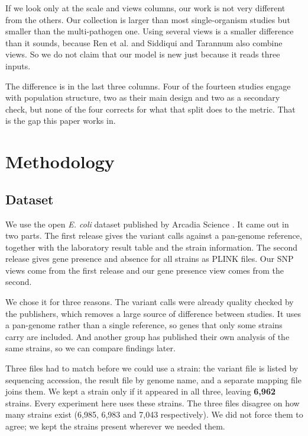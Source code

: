 \documentclass[conference]{IEEEtran}
\begin{document}
If we look only at the scale and views columns, our work is not very different
from the others. Our collection is larger than most single-organism studies but
smaller than the multi-pathogen one. Using several views is a smaller difference
than it sounds, because Ren et al. and Siddiqui and Tarannum also combine views.
So we do not claim that our model is new just because it reads three inputs.

The difference is in the last three columns. Four of the fourteen studies engage
with population structure, two as their main design and two as a secondary check,
but none of the four corrects for what that split does to the metric. That is the
gap this paper works in.

\section{Methodology}
\label{sec:method}

\subsection{Dataset}

We use the open \textit{E. coli} dataset published by Arcadia Science
\cite{morin2024,york2025}. It came out in two parts. The first release gives the
variant calls against a pan-genome reference, together with the laboratory result
table and the strain information. The second release gives gene presence and
absence for all strains as PLINK files. Our SNP views come from the first release
and our gene presence view comes from the second.

We chose it for three reasons. The variant calls were already quality checked by
the publishers, which removes a large source of difference between studies. It uses
a pan-genome rather than a single reference, so genes that only some strains carry
are included. And another group has published their own analysis of the same
strains, so we can compare findings later.

Three files had to match before we could use a strain: the variant file is listed by
sequencing accession, the result file by genome name, and a separate mapping file
joins them. We kept a strain only if it appeared in all three, leaving
\textbf{6{,}962} strains. Every experiment here uses these strains. The three files
disagree on how many strains exist (6{,}985, 6{,}983 and 7{,}043 respectively). We
did not force them to agree; we kept the strains present wherever we needed them.
\end{document}
